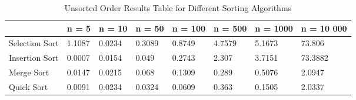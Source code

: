 \begin{table}[ht]
    \centering
    \caption{Unsorted Order Results Table for Different Sorting Algorithms}
    \begin{tabular}[t]{|l| l l l l l l l|} 
    \hline
    & n = 5 & n = 10 & n = 50 & n = 100 & n = 500 & n = 1000 & n = 10 000\\ [0.5ex] 
    \hline
    Selection Sort & 1.1087 &	0.0234 &	0.3089 & 	0.8749 & 	4.7579	& 5.1673 &	73.806  \\ 
    \hline
    Insertion Sort & 0.0007 &	0.0154 &	0.049	 & 0.2743	 & 2.307	& 3.7151 &	73.3882 \\
    \hline
    Merge Sort & 0.0147 &	0.0215 &	0.068	 & 0.1309	 & 0.289	& 0.5076 &	2.0947\\
    \hline
    Quick Sort & 0.0091 &	0.0234 &	0.0324 & 	0.0609 & 	0.363	& 0.1505 &	2.0337 \\
     \hline
    \end{tabular}
\end{table}




